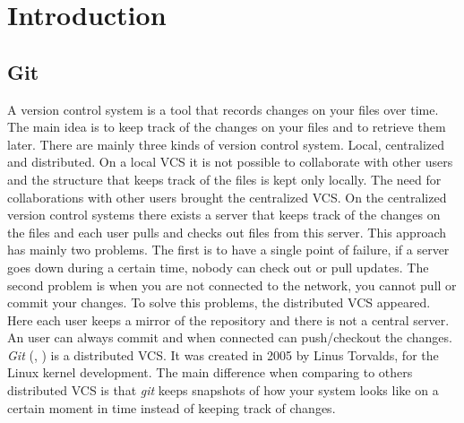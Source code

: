 \chapter{Introduction}
\section{Git}
A version control system is a tool that records changes on your
files over time. The main idea is to keep track of the changes on your
files and to retrieve them later. There are mainly three kinds of 
version control system. Local, centralized and distributed. On
a local VCS it is not possible to collaborate with other users and
the structure that keeps track of the files is kept only locally. The
need for collaborations with other users brought the centralized VCS.
On the centralized version control systems there exists a server that keeps
track of the changes on the files and each user pulls and checks out files
from this server. This approach has mainly two problems. The
first is to have a single point of failure, if a server goes down
during a certain time, nobody can check out or pull updates. The
second problem is when you are not connected to the network, you
cannot pull or commit your changes. To solve this problems, the
distributed VCS appeared. Here each user keeps a mirror of the
repository and there is not a central server. An user can always commit
and when connected can push/checkout the changes.\\

\emph{Git} (\cite{progit}, \cite{gitComm}) is a distributed VCS. It was created in 2005 by Linus Torvalds,
for the Linux kernel development. The main difference when comparing to
others distributed VCS is that \emph{git} keeps snapshots of how your system
looks like on a certain moment in time instead of keeping track of
changes.\par
